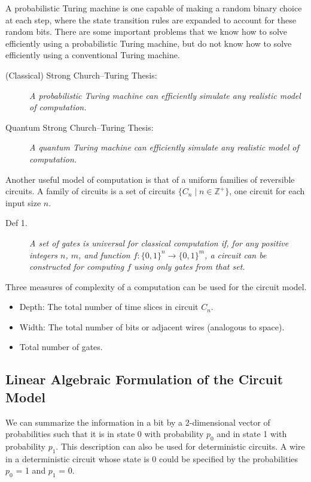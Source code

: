 \documentclass[12pt]{article}
\begin{document}
A probabilistic Turing machine is one capable of making a random binary choice at each step, where the state transition rules are expanded to account for these random bits.
There are some important problems that we know how to solve efficiently using a probabilistic Turing machine, but do not know how to solve efficiently using a conventional Turing machine.

\begin{description}
    \item[(Classical) Strong Church–Turing Thesis:] \textit{A probabilistic Turing machine can efficiently simulate any realistic model of computation.}
    \item[Quantum Strong Church–Turing Thesis:] \textit{A quantum Turing machine can efficiently simulate any realistic model of computation.}
\end{description}

Another useful model of computation is that of a uniform families of reversible circuits.
A family of circuits is a set of circuits \(\{C_n \mid n \in \mathbb{Z}^+\}\), one circuit for each input size \(n\).

\begin{description}
    \item[Def 1.] \textit{A set of gates is \textit{universal} for classical computation if, for any positive integers \(n\), \(m\), and function \(f : \{0, 1\}^n \to \{0, 1\}^m\), a circuit can be constructed for computing \(f\) using only gates from that set.}
\end{description}

Three measures of complexity of a computation can be used for the circuit model.
\begin{itemize}[nosep]
    \item Depth: The total number of time slices in circuit \(C_n\).
    \item Width: The total number of bits or adjacent wires (analogous to space).
    \item Total number of gates.
\end{itemize}

\subsection{Linear Algebraic Formulation of the Circuit Model}

We can summarize the information in a bit by a 2-dimensional vector of probabilities such that it is in state 0 with probability \(p_0\) and in state 1 with probability \(p_1\). This description can also be used for deterministic circuits. A wire in a deterministic circuit whose state is 0 could be specified by the probabilities \(p_0\) = 1 and \(p_1\) = 0.
\end{document}
